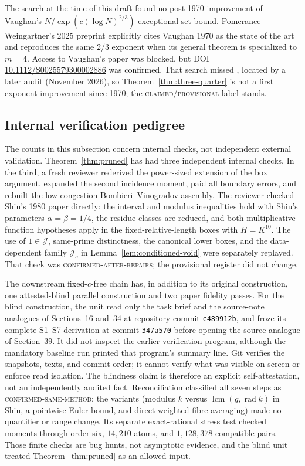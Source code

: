 \documentclass[10pt,reqno]{amsart}
\theoremstyle{definition}
\newcommand{\rad}{\operatorname {rad}}
\newcommand{\lcm}{\operatorname {lcm}}
\newcommand{\1}{\mathbf 1}
\begin{document}
The search at the time of this draft found no post-1970 improvement of Vaughan's
$N/\exp(c(\log N)^{2/3})$ exceptional-set bound.  Pomerance--Weingartner's
2025 preprint \cite[\S4]{PomeranceWeingartner} explicitly cites Vaughan
1970 as the state of the art and reproduces the same $2/3$ exponent when
its general theorem is specialized to $m=4$.  Access to Vaughan's paper was
blocked, but DOI \href{https://doi.org/10.1112/S0025579300002886}
{10.1112/S0025579300002886} was confirmed.  That search missed
\cite{KRK}, located by a later audit (November 2026), so
Theorem~\ref{thm:three-quarter} is not a first exponent improvement since
1970; the \textsc{claimed/provisional} label stands.

\subsection{Internal verification pedigree}\label{sec:pedigree}
The counts in this subsection concern internal checks, not independent
external validation.  Theorem~\ref{thm:pruned} has had three independent
internal checks.  In the third, a fresh reviewer rederived the power-sized
extension of the box argument, expanded the second incidence moment, paid
all boundary errors, and rebuilt the low-congestion
Bombieri--Vinogradov assembly.  The reviewer checked Shiu's 1980 paper
\cite{Shiu} directly: the interval and modulus inequalities hold with
Shiu's parameters $\alpha=\beta=1/4$, the residue classes are reduced, and
both multiplicative-function hypotheses apply in the fixed-relative-length
boxes with $H=K^{10}$.  The use of $1\in\mathcal J$, same-prime
distinctness, the canonical lower boxes, and the data-dependent family
$\mathcal J_c$ in Lemma~\ref{lem:conditioned-void} were separately replayed.
That check was \textsc{confirmed-after-repairs}; the provisional register
did not change.

The downstream fixed-$c$-free chain has, in addition to its original
construction, one attested-blind parallel construction and two paper
fidelity passes.  For the blind construction, the unit read only the task
brief and the source-note analogues of Sections~16 and~34 at repository
commit \texttt{c489912b}, and froze its complete S1--S7 derivation at
commit \texttt{347a570} before opening the source analogue of Section~39.
It did not inspect the earlier verification program, although the mandatory
baseline run printed that program's summary line.  Git verifies the
snapshots, texts, and commit order; it cannot verify what was visible on
screen or enforce read isolation.  The blindness claim is therefore an
explicit self-attestation, not an independently audited fact.  Reconciliation
classified all seven steps as \textsc{confirmed-same-method}; the variants
(modulus $k$ versus $\lcm(g,\rad k)$ in Shiu, a pointwise Euler bound, and
direct weighted-fibre averaging) made no quantifier or range change.  Its
separate exact-rational stress test checked moments through order six,
$14{,}210$ atoms, and $1{,}128{,}378$ compatible pairs.  Those finite checks
are bug hunts, not asymptotic evidence, and the blind unit treated
Theorem~\ref{thm:pruned} as an allowed input.
\end{document}
